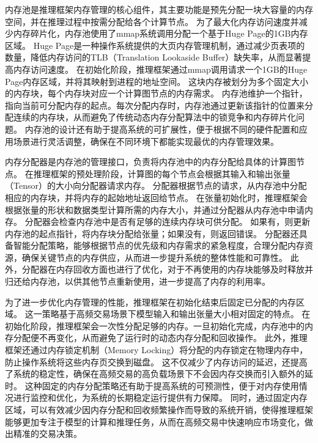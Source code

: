 内存池是推理框架内存管理的核心组件，其主要功能是预先分配一块大容量的内存空间，并在推理过程中按需分配给各个计算节点。
为了最大化内存访问速度并减少内存碎片化，内存池使用了mmap系统调用分配一个基于Huge Page的1GB内存区域。
Huge Page是一种操作系统提供的大页内存管理机制，通过减少页表项的数量，降低内存访问的TLB（Translation Lookaside Buffer）缺失率，从而显著提高内存访问速度。
在初始化阶段，推理框架通过mmap调用请求一个1GB的Huge Page内存区域，并将其映射到进程的地址空间。
这块内存被划分为多个固定大小的内存块，每个内存块对应一个计算图节点的内存需求。
内存池维护一个指针，指向当前可分配内存的起点。每次分配内存时，内存池通过更新该指针的位置来分配连续的内存块，从而避免了传统动态内存分配算法中的锁竞争和内存碎片化问题。
内存池的设计还有助于提高系统的可扩展性，便于根据不同的硬件配置和应用场景进行灵活调整，确保在不同环境下都能实现最优的内存管理效果。

内存分配器是内存池的管理接口，负责将内存池中的内存分配给具体的计算图节点。
在推理框架的预处理阶段，计算图的每个节点会根据其输入和输出张量（Tensor）的大小向分配器请求内存。
分配器根据节点的请求，从内存池中分配相应的内存块，并将内存的起始地址返回给节点。
在张量初始化时，推理框架会根据张量的形状和数据类型计算所需的内存大小，并通过分配器从内存池中申请内存。
分配器会检查内存池中是否有足够的连续内存块可供分配。
如果有，则更新内存池的起点指针，将内存块分配给张量；如果没有，则返回错误。
分配器还具备智能分配策略，能够根据节点的优先级和内存需求的紧急程度，合理分配内存资源，确保关键节点的内存供应，从而进一步提升系统的整体性能和可靠性。
此外，分配器在内存回收方面也进行了优化，对于不再使用的内存块能够及时释放并归还给内存池，以供其他节点重新使用，进一步提高了内存的利用率。

为了进一步优化内存管理的性能，推理框架在初始化结束后固定已分配的内存区域。
这一策略基于高频交易场景下模型输入和输出张量大小相对固定的特点。
在初始化阶段，推理框架会一次性分配足够的内存。一旦初始化完成，内存池中的内存分配便不再变化，从而避免了运行时的动态内存分配和回收操作。
此外，推理框架还通过内存锁定机制（Memory Locking）将分配的内存锁定在物理内存中，防止操作系统将这些内存页交换到磁盘。
这不仅减少了内存访问的延迟，还提高了系统的稳定性，确保在高频交易的高负载场景下不会因内存交换而引入额外的延时。
这种固定的内存分配策略还有助于提高系统的可预测性，便于对内存使用情况进行监控和优化，为系统的长期稳定运行提供有力保障。
同时，通过固定内存区域，可以有效减少因内存分配和回收频繁操作而导致的系统开销，使得推理框架能够更加专注于模型的计算和推理任务，从而在高频交易中快速响应市场变化，做出精准的交易决策。

